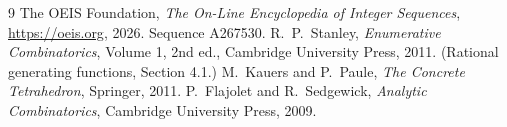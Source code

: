 \documentclass[11pt,a4paper]{article}
\theoremstyle{plain}
\theoremstyle{definition}
\begin{document}
\begin{thebibliography}{9}
 The OEIS Foundation, \emph{The On-Line Encyclopedia of Integer
Sequences}, \url{https://oeis.org}, 2026. Sequence A267530.
 R.~P.~Stanley, \emph{Enumerative Combinatorics}, Volume 1, 2nd ed.,
Cambridge University Press, 2011. (Rational generating functions, Section 4.1.)
 M.~Kauers and P.~Paule, \emph{The Concrete Tetrahedron}, Springer, 2011.
 P.~Flajolet and R.~Sedgewick, \emph{Analytic Combinatorics}, Cambridge
University Press, 2009.
\end{thebibliography}
\end{document}
